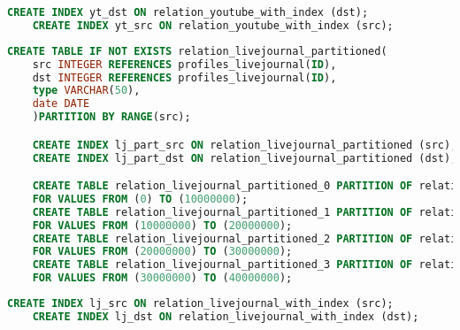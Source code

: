 \begin{lstlisting}[language=SQL,caption=Erstellen von Indexen auf relation Tabelle youtube,frame=single, label={2.indexyoutube.listing}]
    CREATE INDEX yt_dst ON relation_youtube_with_index (dst);
    CREATE INDEX yt_src ON relation_youtube_with_index (src);
\end{lstlisting}

\begin{lstlisting}[language=SQL,caption=Erstellen von partitionierten Tabellen mit Index livejournal,frame=single, label={2.parttableindexlivejournal.listing}]
    CREATE TABLE IF NOT EXISTS relation_livejournal_partitioned(
    src INTEGER REFERENCES profiles_livejournal(ID),
    dst INTEGER REFERENCES profiles_livejournal(ID),
    type VARCHAR(50),
    date DATE
    )PARTITION BY RANGE(src);

    CREATE INDEX lj_part_src ON relation_livejournal_partitioned (src);
    CREATE INDEX lj_part_dst ON relation_livejournal_partitioned (dst);

    CREATE TABLE relation_livejournal_partitioned_0 PARTITION OF relation_livejournal_partitioned
    FOR VALUES FROM (0) TO (10000000);
    CREATE TABLE relation_livejournal_partitioned_1 PARTITION OF relation_livejournal_partitioned
    FOR VALUES FROM (10000000) TO (20000000);
    CREATE TABLE relation_livejournal_partitioned_2 PARTITION OF relation_livejournal_partitioned
    FOR VALUES FROM (20000000) TO (30000000);
    CREATE TABLE relation_livejournal_partitioned_3 PARTITION OF relation_livejournal_partitioned
    FOR VALUES FROM (30000000) TO (40000000);
\end{lstlisting}

\begin{lstlisting}[language=SQL,caption=Erstellen von Indexen auf relation Tabelle livejournal,frame=single, label={2.indexlivejournal.listing}]
    CREATE INDEX lj_src ON relation_livejournal_with_index (src);
    CREATE INDEX lj_dst ON relation_livejournal_with_index (dst);
\end{lstlisting}

